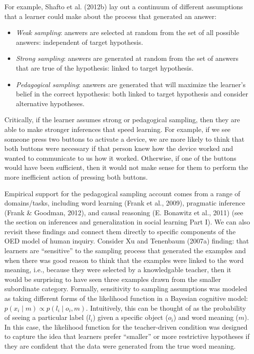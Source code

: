 \documentclass[english,floatsintext,man]{apa6}
\providecommand{\tightlist}{%
  \setlength{\itemsep}{0pt}\setlength{\parskip}{0pt}}
\theoremstyle{definition}
\theoremstyle{definition}
\theoremstyle{definition}
\theoremstyle{remark}
\begin{document}
For example, Shafto et al. (2012b) lay out a continuum of different
assumptions that a learner could make about the process that generated
an answer:

\begin{itemize}
\tightlist
\item
  \emph{Weak sampling}: answers are selected at random from the set of
  all possible answers: independent of target hypothesis.
\item
  \emph{Strong sampling}: answers are generated at random from the set
  of answers that are true of the hypothesis: linked to target
  hypothesis.
\item
  \emph{Pedagogical sampling}: answers are generated that will maximize
  the learner's belief in the correct hypothesis: both linked to target
  hypothesis and consider alternative hypotheses.
\end{itemize}

\noindent
Critically, if the learner assumes strong or pedagogical sampling, then
they are able to make stronger inferences that speed learning. For
example, if we see someone press two buttons to activate a device, we
are more likely to think that both buttons were necessary if that person
knew how the device worked and wanted to communicate to us how it
worked. Otherwise, if one of the buttons would have been sufficient,
then it would not make sense for them to perform the more inefficient
action of pressing both buttons.

Empirical support for the pedagogical sampling account comes from a
range of domains/tasks, including word learning (Frank et al., 2009),
pragmatic inference (Frank \& Goodman, 2012), and causal reasoning (E.
Bonawitz et al., 2011) (see the section on inferences and generalization
in social learning Part I). We can also revisit these findings and
connect them directly to specific components of the OED model of human
inquiry. Consider Xu and Tenenbaum (2007a) finding: that learners are
\enquote{sensitive} to the sampling process that generated the examples
and when there was good reason to think that the examples were linked to
the word meaning, i.e., because they were selected by a knowledgable
teacher, then it would be surprising to have seen three examples drawn
from the smaller subordinate category. Formally, sensitivity to sampling
assumptions was modeled as taking different forms of the likelihood
function in a Bayesian cognitive model:
\(p(x_i \mid m) \propto p(l_i \mid o_i, m)\). Intuitively, this can be
thought of as the probability of seeing a particular label (\(l_i\))
given a specific object (\(o_i\)) and word meaning (\(m\)). In this
case, the likelihood function for the teacher-driven condition was
designed to capture the idea that learners prefer \enquote{smaller} or
more restrictive hypotheses if they are confident that the data were
generated from the true word meaning.
\end{document}

